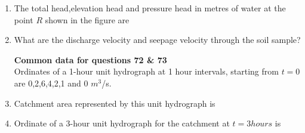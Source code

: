 \documentclass[journal]{IEEEtran}
\begin{document}
\begin {enumerate}[start=70]
\item %
The total head,elevation head and pressure head in metres of water at the point $R$ shown in the figure are
\begin{enumerate}
\end{enumerate}
\item %
What are the discharge velocity and seepage velocity through the soil sample?
\begin{enumerate}
\end{enumerate}
\textbf{Common data for questions 72 \& 73} \\
Ordinates of a 1-hour unit hydrograph at 1 hour intervals, starting from $t=0$ are 0,2,6,4,2,1 and 0 $m^3$/s.
\item %
Catchment area represented by this unit hydrograph is 
\begin{enumerate}
\end{enumerate}
\item %
Ordinate of a 3-hour unit hydrograph for the catchment at $t=3 hours$ is 
\begin{enumerate}
\end{enumerate}
\end{enumerate}
\end{document}

